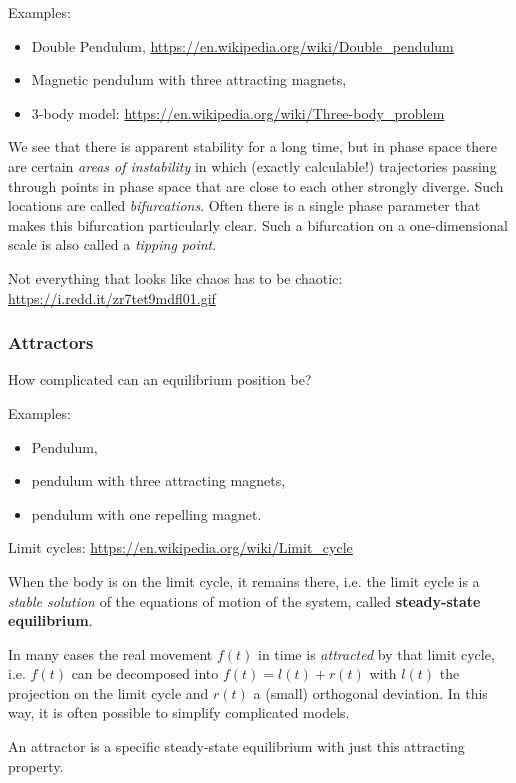 \documentclass[11pt,a4paper]{article}
\begin{document}
Examples: 
\begin{itemize}
\item Double Pendulum, \url{https://en.wikipedia.org/wiki/Double_pendulum}
\item Magnetic pendulum with three attracting magnets,
\item 3-body model: \url{https://en.wikipedia.org/wiki/Three-body_problem}
\end{itemize}

We see that there is apparent stability for a long time, but in phase space
there are certain \emph{areas of instability} in which (exactly calculable!)
trajectories passing through points in phase space that are close to each
other strongly diverge. Such locations are called \emph{bifurcations}.  Often
there is a single phase parameter that makes this bifurcation particularly
clear. Such a bifurcation on a one-dimensional scale is also called a
\emph{tipping point}.

Not everything that looks like chaos has to be chaotic:\\
\url{https://i.redd.it/zr7tet9mdfl01.gif}

\subsubsection{Attractors}

How complicated can an equilibrium position be? 

Examples: 
\begin{itemize}
\item Pendulum,
\item pendulum with three attracting magnets,
\item pendulum with one repelling magnet.
\end{itemize}

Limit cycles: \url{https://en.wikipedia.org/wiki/Limit_cycle}

When the body is on the limit cycle, it remains there, i.e. the limit cycle is
a \emph{stable solution} of the equations of motion of the system, called
\textbf{steady-state equilibrium}.
    
In many cases the real movement $f(t)$ in time is \emph{attracted} by that
limit cycle, i.e. $f(t)$ can be decomposed into $f(t)=l(t)+r(t)$ with $l(t)$
the projection on the limit cycle and $r(t)$ a (small) orthogonal deviation.
In this way, it is often possible to simplify complicated models.

An attractor is a specific steady-state equilibrium with just this attracting
property.
\end{document}
